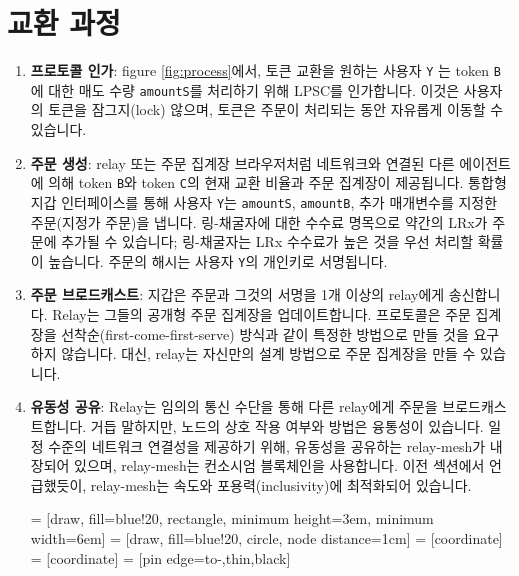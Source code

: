 \documentclass[UTF8,nofonts]{article}
\makeatletter
\newenvironment{figurehere}
 {\def\@captype{figure}}
 {}
\makeatother
\begin{document}
\begin{multicols}{2}
\begin{itemize}
\end{itemize}


\section{교환 과정\label{sec:process}}



\begin{enumerate} 


\item \textbf{프로토콜 인가}: figure \ref{fig:process}에서, 토큰 교환을 원하는 사용자 \verb|Y| 는 token \verb|B|에 대한 매도 수량 \verb|amountS|를 처리하기 위해 LPSC를 인가합니다. 이것은 사용자의 토큰을 잠그지(lock) 않으며, 토큰은 주문이 처리되는 동안 자유롭게 이동할 수 있습니다.

\item \textbf{주문 생성}: relay 또는 주문 집계장 브라우저처럼 네트워크와 연결된 다른 에이전트에 의해 token \verb|B|와 token \verb|C|의 현재 교환 비율과 주문 집계장이 제공됩니다. 통합형 지갑 인터페이스를 통해 사용자 \verb|Y|는 \verb|amountS|, \verb|amountB|, 추가 매개변수를 지정한 주문(지정가 주문)을 냅니다. 링-채굴자에 대한 수수료 명목으로 약간의 LRx가 주문에 추가될 수 있습니다; 링-채굴자는 LRx 수수료가 높은 것을 우선 처리할 확률이 높습니다. 주문의 해시는 사용자 \verb|Y|의 개인키로 서명됩니다.    

\item \textbf{주문 브로드캐스트}: 지갑은 주문과 그것의 서명을 1개 이상의 relay에게 송신합니다. Relay는 그들의 공개형 주문 집계장을 업데이트합니다. 프로토콜은 주문 집계장을 선착순(first-come-first-serve) 방식과 같이 특정한 방법으로 만들 것을 요구하지 않습니다. 대신, relay는 자신만의 설계 방법으로 주문 집계장을 만들 수 있습니다.

\item \textbf{유동성 공유}: Relay는 임의의 통신 수단을 통해 다른 relay에게 주문을 브로드캐스트합니다. 거듭 말하지만, 노드의 상호 작용 여부와 방법은 융통성이 있습니다. 일정 수준의 네트워크 연결성을 제공하기 위해, 유동성을 공유하는 relay-mesh가 내장되어 있으며, relay-mesh는 컨소시엄 블록체인을 사용합니다. 이전 섹션에서 언급했듯이, relay-mesh는 속도와 포용력(inclusivity)에 최적화되어 있습니다.

\begin{center}
\begin{figurehere}
\centering
{} = [draw, fill=blue!20, rectangle, 
    minimum height=3em, minimum width=6em]
 = [draw, fill=blue!20, circle, node distance=1cm]
 = [coordinate]
 = [coordinate]
 = [pin edge={to-,thin,black}]


\end{figurehere}
\end{center}
\end{enumerate}
\end{multicols}
\end{document}
